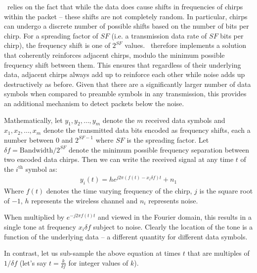 \name\ relies on the fact that while the data does cause shifts in frequencies of chirps within the packet -- these shifts are not completely random. In particular, chirps can undergo a discrete number of possible shifts based on the number of bits per chirp. For a spreading factor of $SF$ (i.e. a transmission data rate of $SF$ bits per chirp), the frequency shift is one of $2^{SF}$ values. \name\ therefore implements a solution that coherently reinforces adjacent chirps, modulo the minimum possible frequency shift between them. This ensures that regardless of their underlying data, adjacent chirps always add up to reinforce each other while noise adds up destructively as before. Given that there are a significantly larger number of data symbols when compared to preamble symbols in any transmission, this provides an additional mechanism to detect packets below the noise. 

Mathematically, let $y_1, y_2, \dots, y_m$ denote the $m$ received data symbols and $x_1, x_2, \dots, x_m$ denote the transmitted data bits encoded as frequency shifts, each a number between $0$ and $2^{SF-1}$ where $SF$ is the spreading factor. Let $\delta f = \text{Bandwidth} / 2^{SF}$ denote the minimum possible frequency separation between two encoded data chirps.  Then we can write the received signal at any time $t$ of the $i^{\text{th}}$ symbol as:
\begin{align}
    y_i(t) = h e^{j 2 \pi (f(t) - x_i \delta f) t} + n_1 \label{eqn:yi}
\end{align}
Where $f(t)$ denotes the time varying frequency of the chirp, $j$ is the square root of $-1$, $h$ represents the wireless channel and $n_i$ represents noise. 

When multiplied by $e^{-j 2 \pi f(t) t}$ and viewed in the Fourier domain, this results in a single tone at frequency $x_i \delta f$ subject to noise. Clearly the location of the tone is a function of the underlying data -- a different quantity for different data symbols. 

In contrast, let us sub-sample the above equation at times $t$ that are multiples of $1/\delta f$ (let's say $t = \frac{k}{\delta f}$ for integer values of $k$). 

